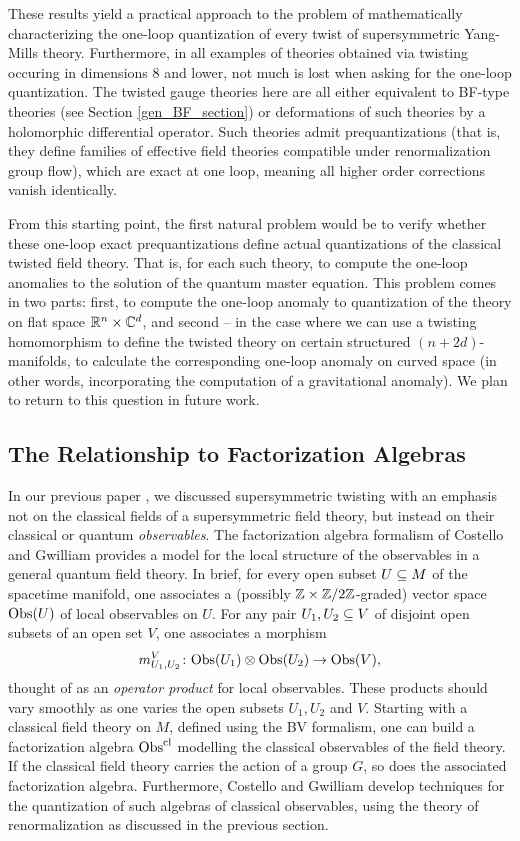 \documentclass[10pt, oneside]{article}
\begin{document}
These results yield a practical approach to the problem of mathematically characterizing the one-loop quantization of every twist of supersymmetric Yang-Mills theory. Furthermore, in all examples of theories obtained via twisting occuring in dimensions 8 and lower, not much is lost when asking for the one-loop quantization.  The twisted gauge theories here are all either equivalent to BF-type theories (see Section \ref{gen_BF_section}) or deformations of such theories by a holomorphic differential operator.  Such theories admit prequantizations (that is, they define families of effective field theories compatible under renormalization group flow), which are exact at one loop, meaning all higher order corrections vanish identically.  

From this starting point, the first natural problem would be to verify whether these one-loop exact prequantizations define actual quantizations of the classical twisted field theory.  That is, for each such theory, to compute the one-loop anomalies to the solution of the quantum master equation.  This problem comes in two parts: first, to compute the one-loop anomaly to quantization of the theory on flat space $\mathbb R^n \times \mathbb C^d$, and second -- in the case where we can use a twisting homomorphism to define the twisted theory on certain structured $(n+2d)$-manifolds, to calculate the corresponding one-loop anomaly on curved space (in other words, incorporating the computation of a gravitational anomaly). We plan to return to this question in future work.

\subsection*{The Relationship to Factorization Algebras}
In our previous paper \cite{ElliottSafronov}, we discussed supersymmetric twisting with an emphasis not on the classical fields of a supersymmetric field theory, but instead on their classical or quantum \emph{observables}.  The factorization algebra formalism of Costello and Gwilliam \cite{Book1, Book2} provides a model for the local structure of the observables in a general quantum field theory.  In brief, for every open subset $U \subseteq M$ of the spacetime manifold, one associates a (possibly $\mathbb Z \times \mathbb Z/2\mathbb Z$-graded) vector space $\mathrm{Obs}(U)$ of local observables on $U$.  For any pair $U_1, U_2 \subseteq V$ of disjoint open subsets of an open set $V$, one associates a morphism
\[m_{U_1, U_2}^V \colon \mathrm{Obs}(U_1) \otimes \mathrm{Obs}(U_2)\to \mathrm{Obs}(V),\]
thought of as an \emph{operator product} for local observables.  These products should vary smoothly as one varies the open subsets $U_1, U_2$ and $V$.  Starting with a classical field theory on $M$, defined using the BV formalism, one can build a factorization algebra $\mathrm{Obs}^{\mathrm{cl}}$ modelling the classical observables of the field theory.  If the classical field theory carries the action of a group $G$, so does the associated factorization algebra.  Furthermore, Costello and Gwilliam develop techniques for the quantization of such algebras of classical observables, using the theory of renormalization as discussed in the previous section.
\end{document}
